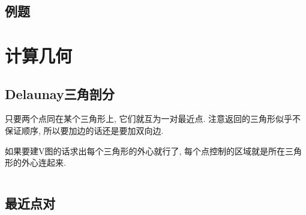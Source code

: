 \documentclass[a4paper, twoside]{article}
\begin{document}
\begin{multicols}{2}
			\subsection{例题}
				

		\newpage
		\section{计算几何}
		 	\subsection{Delaunay三角剖分}
				只要两个点同在某个三角形上, 它们就互为一对最近点. 注意返回的三角形似乎不保证顺序, 所以要加边的话还是要加双向边.
				
				如果要建V图的话求出每个三角形的外心就行了, 每个点控制的区域就是所在三角形的外心连起来.
				\inputminted{cpp}{../src/geometry/delaunay.cpp}
		
	\end{multicols}
			
			\subsection{最近点对}
				

		\newpage
	
\end{document}
